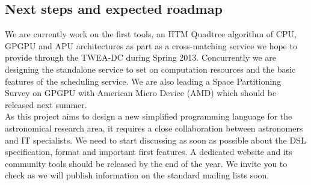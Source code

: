 		\subsection{Next steps and expected roadmap}
			We are currently work on the first tools, an HTM Quadtree algorithm of CPU, GPGPU and APU architectures as part as a cross-matching service we hope to provide through the TWEA-DC during Spring 2013.
			Concurrently we are designing the standalone service to set on computation resources and the basic features of the scheduling service.
			We are also leading a Space Partitioning Survey on GPGPU with American Micro Device (AMD) which should be released next summer.
			\\
			As this project aims to design a new simplified programming language for the astronomical research area, it requires a close collaboration between astronomers and IT specialists.
			We need to start discussing as soon as possible about the DSL specification, format and important first features.
			A dedicated website and its community tools should be released by the end of the year.
			We invite you to check as we will publish information on the standard mailing lists soon.


